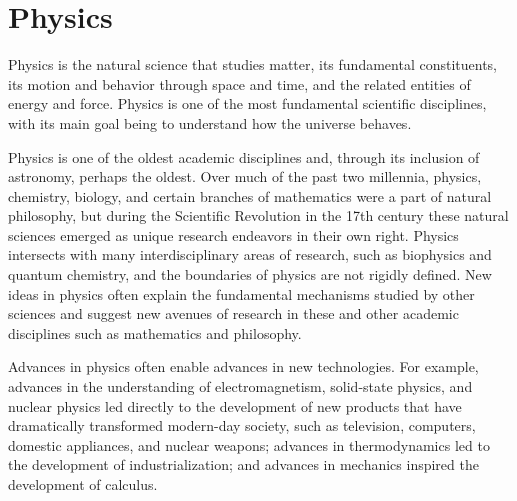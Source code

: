 \documentclass[main.tex]{subfiles}
\begin{document}
\chapter{Physics}
Physics is the natural science that studies matter, its fundamental constituents, its motion and behavior through space and time, and the related entities of energy and force. Physics is one of the most fundamental scientific disciplines, with its main goal being to understand how the universe behaves.

Physics is one of the oldest academic disciplines and, through its inclusion of astronomy, perhaps the oldest. Over much of the past two millennia, physics, chemistry, biology, and certain branches of mathematics were a part of natural philosophy, but during the Scientific Revolution in the 17th century these natural sciences emerged as unique research endeavors in their own right. Physics intersects with many interdisciplinary areas of research, such as biophysics and quantum chemistry, and the boundaries of physics are not rigidly defined. New ideas in physics often explain the fundamental mechanisms studied by other sciences and suggest new avenues of research in these and other academic disciplines such as mathematics and philosophy.

Advances in physics often enable advances in new technologies. For example, advances in the understanding of electromagnetism, solid-state physics, and nuclear physics led directly to the development of new products that have dramatically transformed modern-day society, such as television, computers, domestic appliances, and nuclear weapons; advances in thermodynamics led to the development of industrialization; and advances in mechanics inspired the development of calculus.
\end{document}
